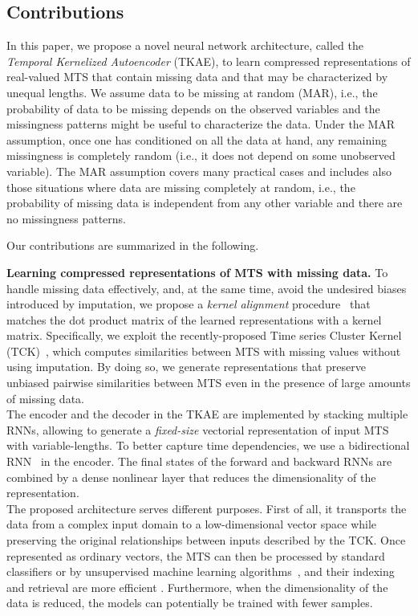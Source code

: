 \documentclass[a4paper,10pt,pdftex]{article}
\begin{document}
\subsection{Contributions}
In this paper, we propose a novel neural network architecture, called the \textit{Temporal Kernelized Autoencoder} (TKAE), to learn compressed representations of real-valued MTS that contain missing data and that may be characterized by unequal lengths.
We assume data to be missing at random (MAR), i.e., the probability of data to be missing depends on the observed variables and the missingness patterns might be useful to characterize the data.
Under the MAR assumption, once one has conditioned on all the data at hand, any remaining missingness is completely random (i.e., it does not depend on some unobserved variable). 
The MAR assumption covers many practical cases and includes also those situations where data are missing completely at random, i.e., the probability of missing data is independent from any other variable and there are no missingness patterns. 

Our contributions are summarized in the following.
\newline

\textbf{Learning compressed representations of MTS with missing data.}
To handle missing data effectively, and, at the same time, avoid the undesired biases introduced by imputation, we propose a \textit{kernel alignment} procedure~\cite{kernelAE} that matches the dot product matrix of the learned representations with a kernel matrix. 
Specifically, we exploit the recently-proposed Time series Cluster Kernel (TCK)~\cite{mikalsen2017time}, which computes similarities between MTS with missing values without using imputation. By doing so, we generate representations that preserve unbiased pairwise similarities between MTS even in the presence of large amounts of missing data. 
\\
The encoder and the decoder in the TKAE are implemented by stacking multiple RNNs, allowing to generate a \emph{fixed-size} vectorial representation of input MTS with variable-lengths.
To better capture time dependencies, we use a bidirectional RNN~\cite{6638947} in the encoder.
The final states of the forward and backward RNNs are combined by a dense nonlinear layer that reduces the dimensionality of the representation.
\\
The proposed architecture serves different purposes.
First of all, it transports the data from a complex input domain to a low-dimensional vector space while preserving the original relationships between inputs described by the TCK.
Once represented as ordinary vectors, the MTS can then be processed by standard classifiers or by unsupervised machine learning algorithms~\cite{Xing:2010:BSS:1882471.1882478}, and their indexing and retrieval are more efficient \cite{7179089, chung2016unsupervised}.
Furthermore, when the dimensionality of the data is reduced, the models can potentially be trained with fewer samples.
\newline
\end{document}
